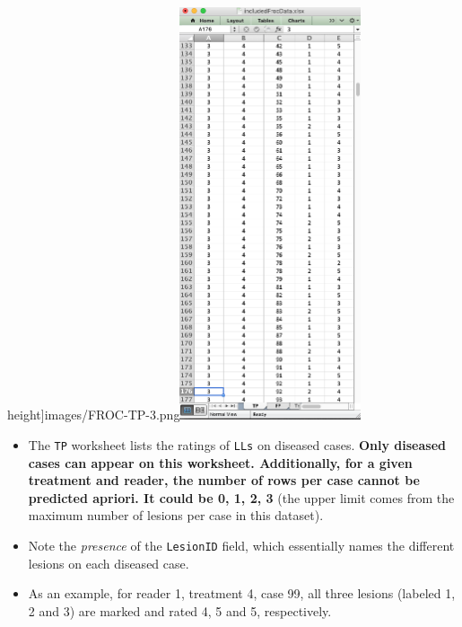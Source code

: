 \documentclass[]{book}
\providecommand{\tightlist}{%
  \setlength{\itemsep}{0pt}\setlength{\parskip}{0pt}}
\begin{document}
height]{images/FROC-TP-3.png}\includegraphics[width=0.4\textwidth,height=\textheight]{images/FROC-TP-4.png}

\begin{itemize}
\tightlist
\item
  The \texttt{TP} worksheet lists the ratings of \texttt{LLs} on diseased cases. \textbf{Only diseased cases can appear on this worksheet. Additionally, for a given treatment and reader, the number of rows per case cannot be predicted apriori. It could be 0, 1, 2, 3} (the upper limit comes from the maximum number of lesions per case in this dataset).
\item
  Note the \emph{presence} of the \texttt{LesionID} field, which essentially names the different lesions on each diseased case.
\item
  As an example, for reader 1, treatment 4, case 99, all three lesions (labeled 1, 2 and 3) are marked and rated 4, 5 and 5, respectively.
\end{itemize}
\end{document}

